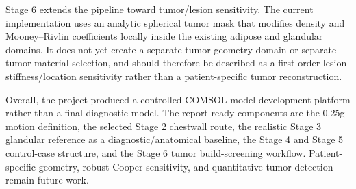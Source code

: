 Stage 6 extends the pipeline toward tumor/lesion sensitivity. The current implementation uses an analytic spherical tumor mask that modifies density and Mooney--Rivlin coefficients locally inside the existing adipose and glandular domains. It does not yet create a separate tumor geometry domain or separate tumor material selection, and should therefore be described as a first-order lesion stiffness/location sensitivity rather than a patient-specific tumor reconstruction.

Overall, the project produced a controlled COMSOL model-development platform rather than a final diagnostic model. The report-ready components are the 0.25g motion definition, the selected Stage 2 chestwall route, the realistic Stage 3 glandular reference as a diagnostic/anatomical baseline, the Stage 4 and Stage 5 control-case structure, and the Stage 6 tumor build-screening workflow. Patient-specific geometry, robust Cooper sensitivity, and quantitative tumor detection remain future work.
